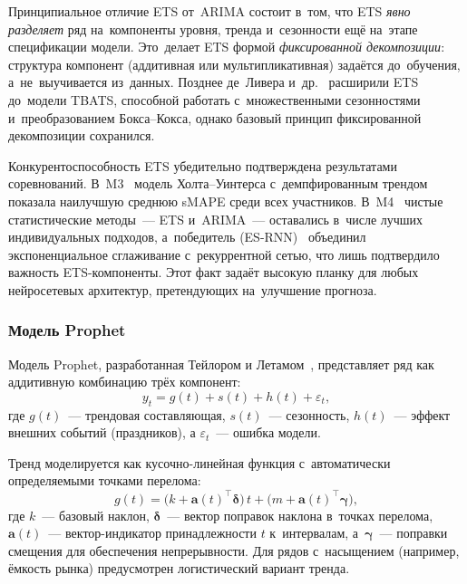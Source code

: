 Принципиальное отличие ETS от~ARIMA состоит в~том, что ETS
\textit{явно разделяет} ряд на~компоненты уровня, тренда и~сезонности
ещё на~этапе спецификации модели.  Это~делает ETS формой
\textit{фиксированной декомпозиции}: структура компонент (аддитивная
или мультипликативная) задаётся до~обучения, а~не~выучивается из~данных.
Позднее де~Ливера и~др.~\cite{delivera2011tbats} расширили ETS
до~модели TBATS, способной работать с~множественными сезонностями
и~преобразованием Бокса--Кокса, однако базовый принцип фиксированной
декомпозиции сохранился.

Конкурентоспособность ETS убедительно подтверждена результатами
соревнований.  В~M3~\cite{makridakis2000m3} модель Холта--Уинтерса
с~демпфированным трендом показала наилучшую среднюю sMAPE среди всех
участников.  В~M4~\cite{makridakis2020m4} чистые статистические
методы~--- ETS и~ARIMA~--- оставались в~числе лучших индивидуальных
подходов, а~победитель (ES-RNN)~\cite{smyl2020hybrid} объединил
экспоненциальное сглаживание с~рекуррентной сетью, что лишь подтвердило
важность ETS-компоненты.  Этот факт задаёт высокую планку для любых
нейросетевых архитектур, претендующих на~улучшение прогноза.


\subsubsection{Модель Prophet}
\label{sssec:prophet}

Модель Prophet, разработанная Тейлором и Летамом~\cite{taylor2018prophet},
представляет ряд как аддитивную комбинацию трёх компонент:
\begin{equation}
\label{eq:prophet}
y_t = g(t) + s(t) + h(t) + \varepsilon_t,
\end{equation}
где $g(t)$~--- трендовая составляющая, $s(t)$~--- сезонность, $h(t)$~---
эффект внешних событий (праздников), а $\varepsilon_t$~--- ошибка модели.

Тренд моделируется как кусочно-линейная функция с~автоматически
определяемыми точками перелома:
\begin{equation}
\label{eq:prophet-trend}
g(t) = \bigl(k + \mathbf{a}(t)^\top\boldsymbol{\delta}\bigr)\,t
     + \bigl(m + \mathbf{a}(t)^\top\boldsymbol{\gamma}\bigr),
\end{equation}
где $k$~--- базовый наклон, $\boldsymbol{\delta}$~--- вектор поправок
наклона в~точках перелома, $\mathbf{a}(t)$~--- вектор-индикатор
принадлежности $t$ к~интервалам, а~$\boldsymbol{\gamma}$~--- поправки
смещения для обеспечения непрерывности.  Для рядов с~насыщением
(например, ёмкость рынка) предусмотрен логистический вариант тренда.

